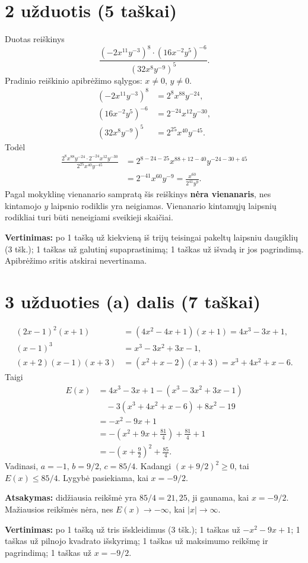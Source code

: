 \documentclass[12pt,a4paper]{exam}
\begin{document}
\section*{2 užduotis (5 taškai)}
Duotas reiškinys
$$\frac{(-2x^{11}y^{-3})^8\cdot(16x^{-2}y^5)^{-6}}{(32x^8y^{-9})^5}.$$
Pradinio reiškinio apibrėžimo sąlygos: $x\ne0$, $y\ne0$.
\begin{align*}
(-2x^{11}y^{-3})^8&=2^8x^{88}y^{-24},\\
(16x^{-2}y^5)^{-6}&=2^{-24}x^{12}y^{-30},\\
(32x^8y^{-9})^5&=2^{25}x^{40}y^{-45}.
\end{align*}
Todėl
\begin{align*}
\frac{2^8x^{88}y^{-24}\cdot2^{-24}x^{12}y^{-30}}{2^{25}x^{40}y^{-45}}
&=2^{8-24-25}x^{88+12-40}y^{-24-30+45}\\
&=2^{-41}x^{60}y^{-9}=\boxed{\frac{x^{60}}{2^{41}y^9}}.
\end{align*}
Pagal mokyklinę vienanario sampratą šis reiškinys \textbf{nėra vienanaris}, nes kintamojo $y$ laipsnio rodiklis yra neigiamas. Vienanario kintamųjų laipsnių rodikliai turi būti neneigiami sveikieji skaičiai.
\par\textbf{Vertinimas:} po 1 tašką už kiekvieną iš trijų teisingai pakeltų laipsniu daugiklių (3 tšk.); 1 taškas už galutinį supaprastinimą; 1 taškas už išvadą ir jos pagrindimą. Apibrėžimo sritis atskirai nevertinama.
\section*{3 užduoties (a) dalis (7 taškai)}
\begin{align*}
(2x-1)^2(x+1)&=(4x^2-4x+1)(x+1)=4x^3-3x+1,\\
(x-1)^3&=x^3-3x^2+3x-1,\\
(x+2)(x-1)(x+3)&=(x^2+x-2)(x+3)=x^3+4x^2+x-6.
\end{align*}
Taigi
\begin{align*}
E(x)&=4x^3-3x+1-(x^3-3x^2+3x-1)\\
&\quad-3(x^3+4x^2+x-6)+8x^2-19\\
&=-x^2-9x+1\\
&=-\left(x^2+9x+\frac{81}{4}\right)+\frac{81}{4}+1\\
&=\boxed{-\left(x+\frac92\right)^2+\frac{85}{4}}.
\end{align*}
Vadinasi, $a=-1$, $b=9/2$, $c=85/4$.
Kadangi $(x+9/2)^2\geq0$, tai $E(x)\leq85/4$.
Lygybė pasiekiama, kai $x=-9/2$.
\par\textbf{Atsakymas:} didžiausia reikšmė yra $85/4=21{,}25$, ji gaunama, kai $x=-9/2$. Mažiausios reikšmės nėra, nes $E(x)\to-\infty$, kai $|x|\to\infty$.
\par\textbf{Vertinimas:} po 1 tašką už tris išskleidimus (3 tšk.); 1 taškas už $-x^2-9x+1$; 1 taškas už pilnojo kvadrato išskyrimą; 1 taškas už maksimumo reikšmę ir pagrindimą; 1 taškas už $x=-9/2$.
\end{document}
